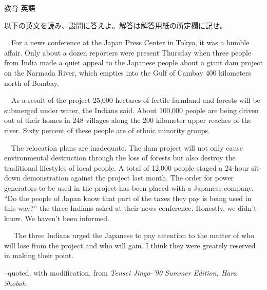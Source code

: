 \documentclass[fleqn]{jbook}
\begin{document}
\begin{question}{教育 英語}{}
\begin{subquestions}
\SubQuestion
    以下の英文を読み、設問に答えよ。解答は解答用紙の所定欄に記せ。
\baselineskip=12pt

    　For a news conference at the Japan Press Center in Tokyo, it was
   a humble affair. Only about a dozen reporters were present Thursday
   when three people from India made a quiet appeal to the Japanese
   people about a giant dam project on the Narmada River, which
   empties into the Gulf of Cambay 400 kilometers north of Bombay.

   　As a result of the project 25,000 hectares of fertile farmland and
   forests will be submerged under water, the Indians said. About
   100,000 people are being driven out of their homes in 248 villages
   along the 200 kilometer upper reaches of the river. Sixty percent
   of these people are of ethnic minority groups.

    　The relocation plans are inadequate. The dam project will not
    only cause environmental destruction through the loss of forests
    but also destroy the traditional lifestyles of local people.
     A total of 12,000 people
    staged a 24-hour sit-down demonstration against the project last
    month.    The order for power generators
    to be used in the project has been placed with a Japanese company. 
    ``Do the people of Japan know that part of the taxes they pay is
    being used in this way?'' the three Indians asked at their news
    conference. Honestly, we didn't know. We haven't been informed.

    　  The three Indians urged
    the Japanese to pay attention to the matter of who will lose from
    the project and who will gain. I think they were greately reserved
    in making their point.
%
 \begin{flushright}
     --quoted, with modification, from \em Tensei Jingo-'90 Summer Edition,
\em Hara Shoboh.
  \end{flushright}



\end{subquestions}
\end{question}
\end{document}
